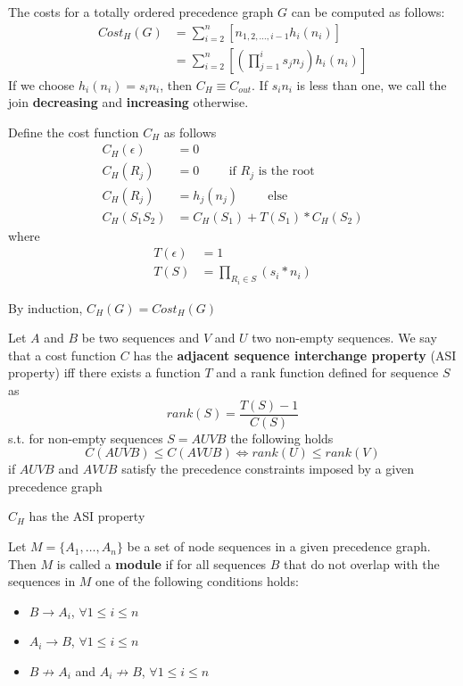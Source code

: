 \documentclass[11pt]{article}
\begin{document}
The costs for a totally ordered precedence graph \(G\) can be computed as follows:
\begin{align*}
Cost_H(G)&=\sum_{i=2}^n[n_{1,2,\dots,i-1}h_i(n_i)]\\
&=\sum_{i=2}^n[(\prod_{j=1}^is_jn_j)h_i(n_i)]
\end{align*}
If we choose \(h_i(n_i)=s_in_i\), then \(C_H\equiv C_{out}\). If \(s_in_i\) is less than one, we call the join
\textbf{decreasing} and \textbf{increasing} otherwise.

\begin{definition}[]
Define the cost function \(C_H\) as follows
\begin{align*}
C_H(\epsilon)&=0\\
C_H(R_j)&=0\hspace{1cm}\text{if $R_j$ is the root}\\
C_H(R_j)&=h_j(n_j)\hspace{1cm}\text{else}\\
C_H(S_1S_2)&=C_H(S_1)+T(S_1)*C_H(S_2)
\end{align*}
where
\begin{align*}
T(\epsilon)&=1\\
T(S)&=\prod_{R_i\in S}(s_i*n_i)
\end{align*}
\end{definition}

By induction, \(C_H(G)=Cost_{H}(G)\)

\begin{definition}[]
Let \(A\) and \(B\) be two sequences and \(V\) and \(U\) two non-empty sequences. We say that a cost
function \(C\) has the \textbf{adjacent sequence interchange property} (ASI property) iff there exists a
function \(T\) and a rank function defined for sequence \(S\) as
\begin{equation*}
rank(S)=\frac{T(S)-1}{C(S)}
\end{equation*}
s.t. for non-empty sequences \(S=AUVB\) the following holds
\begin{equation*}
C(AUVB)\le C(AVUB)\Leftrightarrow rank(U)\le rank(V)
\end{equation*}
if \(AUVB\) and \(AVUB\) satisfy the precedence constraints imposed by a given precedence graph
\end{definition}

\begin{lemma}[]
\label{3.2.3}
\(C_H\) has the ASI property
\end{lemma}

\begin{definition}[]
Let \(M=\{A_1,\dots,A_n\}\) be a set of node sequences in a given precedence graph. Then \(M\) is called a \textbf{module}
if for all sequences \(B\) that do not overlap with the sequences in \(M\) one of the following conditions
holds:
\begin{itemize}
\item \(B\to A_i\), \(\forall 1\le i\le n\)
\item \(A_i\to B\), \(\forall 1\le i\le n\)
\item \(B\not\rightarrow A_i\) and \(A_i\not\rightarrow B\), \(\forall 1\le i\le n\)
\end{itemize}
\end{definition}
\end{document}
